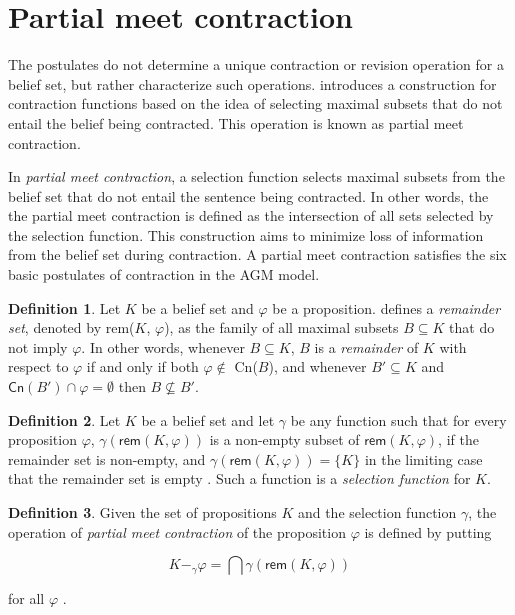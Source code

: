 \section{Partial meet contraction}
\label{sec:partial-meet-contraction}

The postulates do not determine a unique contraction or revision operation for a belief set, but rather characterize such operations. \citet{AGM1985} introduces a construction for contraction functions based on the idea of selecting maximal subsets that do not entail the belief being contracted. This operation is known as partial meet contraction.

In \textit{partial meet contraction}, a selection function selects maximal subsets from the belief set that do not entail the sentence being contracted. In other words, the the partial meet contraction is defined as the intersection of all sets selected by the selection function. This construction aims to minimize loss of information from the belief set during contraction. A partial meet contraction satisfies the six basic postulates of contraction in the AGM model.

\theoremstyle{definition}
\newtheorem{definition}{Definition}[chapter]

\begin{definition}
    Let $K$ be a belief set and $\varphi$ be a proposition. \citet{AM1981} defines a \textit{remainder set}, denoted by \textsf{rem}($K$, $\varphi$), as the family of all maximal subsets $B \subseteq K$ that do not imply $\varphi$. In other words, whenever $B \subseteq K$, $B$ is a \textit{remainder} of $K$ with respect to $\varphi$ if and only if both $\varphi \notin$ \textsf{Cn}($B$), and whenever $B' \subseteq K$ and $\textsf{Cn}(B') \cap \varphi = \emptyset$ then $B \not \subseteq B'$.
\end{definition}

\begin{definition}
    Let $K$ be a belief set and let $\gamma$ be any function such that for every proposition $\varphi$, $\gamma(\textsf{rem}(K, \varphi))$ is a non-empty subset of $\textsf{rem}(K, \varphi)$, if the remainder set is non-empty, and $\gamma(\textsf{rem}(K, \varphi)) = \{ K \}$ in the limiting case that the remainder set is empty \citep{AGM1985}. Such a function is a \textit{selection function} for $K$.
\end{definition}

\begin{definition}
    Given the set of propositions $K$ and the selection function $\gamma$, the operation of \textit{partial meet contraction} of the proposition $\varphi$ is defined by putting

    $$K -_{\gamma} \varphi = \bigcap \gamma(\textsf{rem}(K, \varphi))$$

    for all $\varphi$ \citep{AGM1985}.
\end{definition}

